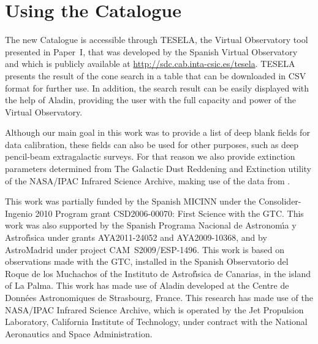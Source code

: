\documentclass[11pt,twoside]{article}
\begin{document}
\section{Using the Catalogue}

The new Catalogue is accessible through TESELA, the Virtual Observatory tool
presented in Paper~I, that was developed by the Spanish Virtual Observatory
and which is publicly available at\,\,\url{http://sdc.cab.inta-csic.es/tesela}.
TESELA presents the result of the cone search in a table
that can be downloaded in CSV format for further use. In addition, the search
result can be easily displayed with the help of Aladin, providing the user with
the full capacity and power of the Virtual Observatory.

Although our main goal in this work was to provide a list of deep blank fields
for data calibration, these fields can also be used for other purposes, such as
deep pencil-beam extragalactic surveys. For that reason we also provide
extinction parameters determined from The Galactic Dust Reddening and
Extinction utility of the NASA/IPAC Infrared Science Archive, making use of the
data from \citet{1998ApJ...500..525S}.

\acknowledgements This work was partially funded by the Spanish MICINN under
the Consolider-Ingenio 2010 Program grant CSD2006-00070: First Science with the
GTC. This work was also supported by the Spanish Programa Nacional de
Astronom\'{\i}a y Astrof\'{\i}sica under grants AYA2011-24052 and
AYA2009-10368, and by AstroMadrid under project CAM~S2009/ESP-1496. This work
is based on observations made with the GTC, installed in the Spanish
Observatorio del Roque de los Muchachos of the Instituto de Astrof\'{\i}sica de
Canarias, in the island of La Palma. This work
has made use of Aladin developed at the Centre de Donn\'{e}es Astronomiques de
Strasbourg, France. This research has made use of the NASA/IPAC Infrared
Science Archive, which is operated by the Jet Propulsion Laboratory, California
Institute of Technology, under contract with the National Aeronautics and Space
Administration.


\end{document}
